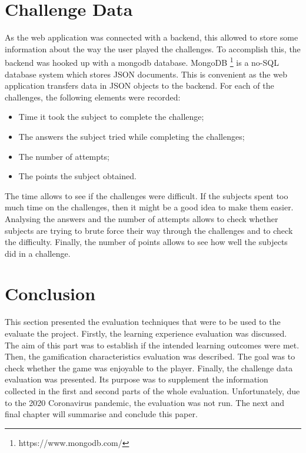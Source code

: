 \documentclass{l4proj}
\begin{document}
\section{Challenge Data}

As the web application was connected with a backend, 
this allowed to store some information about the way the user played the challenges.
To accomplish this, the backend was hooked up with a mongodb database.
MongoDB \footnote{https://www.mongodb.com/} is a no-SQL database system which stores JSON documents.
This is convenient as the web application transfers data in JSON objects to the backend.
For each of the challenges, the following elements were recorded:
\begin{itemize}
    \item Time it took the subject to complete the challenge;
    \item The answers the subject tried while completing the challenges;
    \item The number of attempts;
    \item The points the subject obtained.
\end{itemize}
The time allows to see if the challenges were difficult. If the subjects spent too much time on the challenges,
then it might be a good idea to make them easier.
Analysing the answers and the number of attempts allows to check 
whether subjects are trying to brute force their way through the challenges and to check the difficulty.
Finally, the number of points allows to see how well the subjects did in a challenge.

\section{Conclusion}

This section presented the evaluation techniques that were to be used to the evaluate the project.
Firstly, the learning experience evaluation was discussed. 
The aim of this part was to establish if the intended learning outcomes were met.
Then, the gamification characteristics evaluation was described.
The goal was to check whether the game was enjoyable to the player.
Finally, the challenge data evaluation was presented.
Its purpose was to supplement the information collected in the first and second parts of the whole evaluation.
Unfortunately, due to the 2020 Coronavirus pandemic, the evaluation was not run.
The next and final chapter will summarise and conclude this paper.

\end{document}
